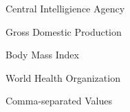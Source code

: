 \documentclass[oneside,12pt]{report}
\begin{document}
 Central Intelligience Agency
\vspace{5pt}

 Gross Domestic Production

\vspace{5pt}

 Body Mass Index

\vspace{5pt}

 World Health Organization

\vspace{5pt}

 Comma-separated Values




\renewcommand\bibname{Selected Bibliography Including Cited Works}
\nocite{*}  %

\end{document}
